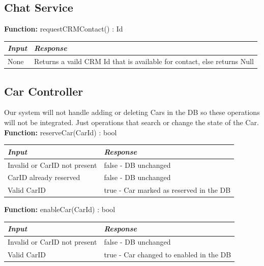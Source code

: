 \documentclass[a4paper]{article}
\begin{document}
\subsection{Chat Service}
\textbf{Function:} requestCRMContact() : Id
\begin{center}
\begin{tabular}{ | L{6cm} | L{6cm} | }
\hline
	\textit{Input}& \textit{Response}\\ \hline
	None & Returns a vaild CRM Id that is available for contact, else returns Null \\ \hline
\end{tabular}
\end{center}
\newpage

\subsection{Car Controller}
Our system will not handle adding or deleting Cars in the DB so these operations will not be integrated. Just operations that search or change the state of the Car.
\textbf{Function:} reserveCar(CarId) : bool
\begin{center}
\begin{tabular}{ | L{6cm} | L{6cm} | }
\hline
	\textit{Input}& \textit{Response}\\ \hline
	Invalid or CarID not present & false - DB unchanged\\ \hline
	CarID already reserved & false - DB unchanged\\ \hline
	Valid CarID & true - Car marked as reserved in the DB\\ \hline
\end{tabular}
\end{center}

\textbf{Function:} enableCar(CarId) : bool
\begin{center}
\begin{tabular}{ | L{6cm} | L{6cm} | }
\hline
	\textit{Input}& \textit{Response}\\ \hline
	Invalid or CarID not present & false - DB unchanged\\ \hline
	Valid CarID & true - Car changed to enabled in the DB\\ \hline
\end{tabular}
\end{center}
\end{document}
